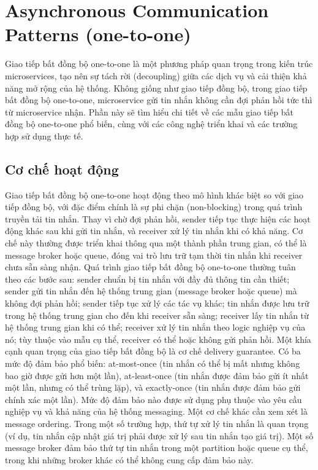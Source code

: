 \section{Asynchronous Communication Patterns (one-to-one)}
Giao tiếp bất đồng bộ one-to-one là một phương pháp quan trọng trong kiến trúc microservices, tạo nên sự tách rời (decoupling) giữa các dịch vụ và cải thiện khả năng mở rộng của hệ thống. Không giống như giao tiếp đồng bộ, trong giao tiếp bất đồng bộ one-to-one, microservice gửi tin nhắn không cần đợi phản hồi tức thì từ microservice nhận. Phần này sẽ tìm hiểu chi tiết về các mẫu giao tiếp bất đồng bộ one-to-one phổ biến, cùng với các công nghệ triển khai và các trường hợp sử dụng thực tế.

\subsection{Cơ chế hoạt động}
Giao tiếp bất đồng bộ one-to-one hoạt động theo mô hình khác biệt so với giao tiếp đồng bộ, với đặc điểm chính là sự phi chặn (non-blocking) trong quá trình truyền tải tin nhắn. Thay vì chờ đợi phản hồi, sender tiếp tục thực hiện các hoạt động khác sau khi gửi tin nhắn, và receiver xử lý tin nhắn khi có khả năng. Cơ chế này thường được triển khai thông qua một thành phần trung gian, có thể là message broker hoặc queue, đóng vai trò lưu trữ tạm thời tin nhắn khi receiver chưa sẵn sàng nhận.
Quá trình giao tiếp bất đồng bộ one-to-one thường tuân theo các bước sau: sender chuẩn bị tin nhắn với đầy đủ thông tin cần thiết; sender gửi tin nhắn đến hệ thống trung gian (message broker hoặc queue) mà không đợi phản hồi; sender tiếp tục xử lý các tác vụ khác; tin nhắn được lưu trữ trong hệ thống trung gian cho đến khi receiver sẵn sàng; receiver lấy tin nhắn từ hệ thống trung gian khi có thể; receiver xử lý tin nhắn theo logic nghiệp vụ của nó; tùy thuộc vào mẫu cụ thể, receiver có thể hoặc không gửi phản hồi.
Một khía cạnh quan trọng của giao tiếp bất đồng bộ là cơ chế delivery guarantee. Có ba mức độ đảm bảo phổ biến: at-most-once (tin nhắn có thể bị mất nhưng không bao giờ được gửi hơn một lần), at-least-once (tin nhắn được đảm bảo gửi ít nhất một lần, nhưng có thể trùng lặp), và exactly-once (tin nhắn được đảm bảo gửi chính xác một lần). Mức độ đảm bảo nào được sử dụng phụ thuộc vào yêu cầu nghiệp vụ và khả năng của hệ thống messaging.
Một cơ chế khác cần xem xét là message ordering. Trong một số trường hợp, thứ tự xử lý tin nhắn là quan trọng (ví dụ, tin nhắn cập nhật giá trị phải được xử lý sau tin nhắn tạo giá trị). Một số message broker đảm bảo thứ tự tin nhắn trong một partition hoặc queue cụ thể, trong khi những broker khác có thể không cung cấp đảm bảo này.

